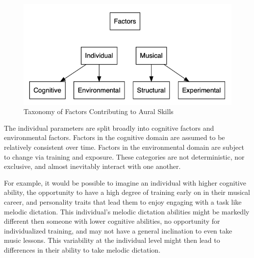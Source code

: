 \documentclass[12pt,]{book}
\begin{document}
\begin{figure}

{\centering \includegraphics[width=1\linewidth]{img/taxonomy} 

}

\caption{Taxonomy of Factors Contributing to Aural Skills}\label{fig:taxonomy}
\end{figure}

The individual parameters are split broadly into cognitive factors and environmental factors.
Factors in the cognitive domain are assumed to be relatively consistent over time.
Factors in the environmental domain are subject to change via training and exposure.
These categories are not deterministic, nor exclusive, and almost inevitably interact with one another.

For example, it would be possible to imagine an individual with higher cognitive ability, the opportunity to have a high degree of training early on in their musical career, and personality traits that lead them to enjoy engaging with a task like melodic dictation.
This individual's melodic dictation abilities might be markedly different then someone with lower cognitive abilities, no opportunity for individualized training, and may not have a general inclination to even take music lessons.
This variability at the individual level might then lead to differences in their ability to take melodic dictation.
\end{document}
